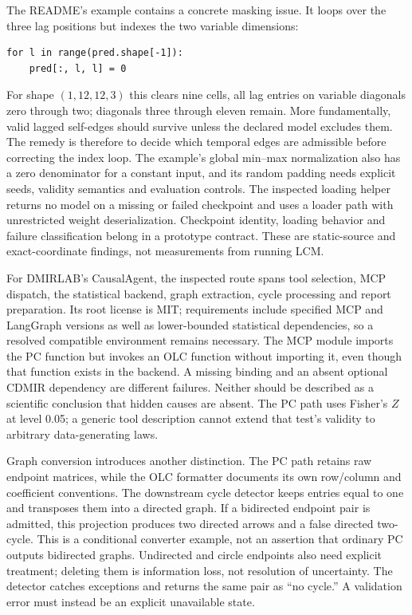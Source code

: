 The README's example contains a concrete masking issue. It loops over the
three lag positions but indexes the two variable dimensions:
\begin{verbatim}
for l in range(pred.shape[-1]):
    pred[:, l, l] = 0
\end{verbatim}
For shape $(1,12,12,3)$ this clears nine cells, all lag entries on variable
diagonals zero through two; diagonals three through eleven remain. More
fundamentally, valid lagged self-edges should survive unless the declared
model excludes them. The remedy is therefore to decide which temporal
edges are admissible before correcting the index loop. The example's global
min--max normalization also has a zero denominator for a constant input,
and its random padding needs explicit seeds, validity semantics and
evaluation controls. The inspected loading helper returns no model on a
missing or failed checkpoint and uses a loader path with unrestricted
weight deserialization. Checkpoint identity, loading behavior and failure
classification belong in a prototype contract. These are static-source and
exact-coordinate findings, not measurements from running LCM.
\citep{exec15_latent_lcm,exec15_latent_exact}

For DMIRLAB's CausalAgent, the inspected route spans tool selection, MCP
dispatch, the statistical backend, graph extraction, cycle processing and
report preparation. Its root license is MIT; requirements include specified
MCP and LangGraph versions as well as lower-bounded statistical dependencies,
so a resolved compatible environment remains necessary. The MCP module
imports the PC function but invokes an OLC function without importing it,
even though that function exists in the backend. A missing binding and an
absent optional CDMIR dependency are different failures. Neither should be
described as a scientific conclusion that hidden causes are absent. The PC
path uses Fisher's $Z$ at level 0.05; a generic tool description cannot
extend that test's validity to arbitrary data-generating laws.
\citep{exec15_latent_causalagent}

Graph conversion introduces another distinction. The PC path retains raw
endpoint matrices, while the OLC formatter documents its own row/column and
coefficient conventions. The downstream cycle detector keeps entries equal
to one and transposes them into a directed graph. If a bidirected endpoint
pair is admitted, this projection produces two directed arrows and a false
directed two-cycle. This is a conditional converter example, not an assertion
that ordinary PC outputs bidirected graphs. Undirected and circle endpoints
also need explicit treatment; deleting them is information loss, not
resolution of uncertainty. The detector catches exceptions and returns the
same pair as ``no cycle.'' A validation error must instead be an explicit
unavailable state.
\citep{exec15_latent_causalagent,exec15_latent_exact}

